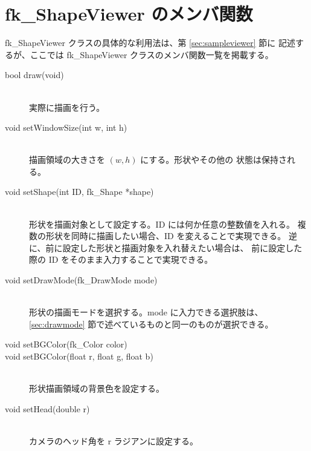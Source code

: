\section{fk\_ShapeViewer のメンバ関数}
fk\_ShapeViewer クラスの具体的な利用法は、第 \ref{sec:sampleviewer} 節に
記述するが、ここでは fk\_ShapeViewer クラスのメンバ関数一覧を掲載する。
\begin{description}
 \item[\hspace*{0.6cm}bool draw(void)] ~ \\
	実際に描画を行う。\\

 \item[\hspace*{0.6cm}void setWindowSize(int w, int h)] ~ \\
	描画領域の大きさを \((w, h)\) にする。形状やその他の
	状態は保持される。\\

 \item[\hspace*{0.6cm}void setShape(int ID, fk\_Shape *shape)] ~ \\
	形状を描画対象として設定する。ID には何か任意の整数値を入れる。
	複数の形状を同時に描画したい場合、ID を変えることで実現できる。
	逆に、前に設定した形状と描画対象を入れ替えたい場合は、
	前に設定した際の ID をそのまま入力することで実現できる。\\

 \item[\hspace*{0.6cm}void setDrawMode(fk\_DrawMode mode)] ~ \\
	形状の描画モードを選択する。mode に入力できる選択肢は、
	\ref{sec:drawmode} 節で述べているものと同一のものが選択できる。\\

 \item[\hspace*{0.6cm}void setBGColor(fk\_Color color)]
 \item[\hspace*{0.6cm}void setBGColor(float r, float g, float b)] ~ \\
	形状描画領域の背景色を設定する。\\

 \item[\hspace*{0.6cm}void setHead(double r)] ~ \\
	カメラのヘッド角を r ラジアンに設定する。\\


\end{description}
